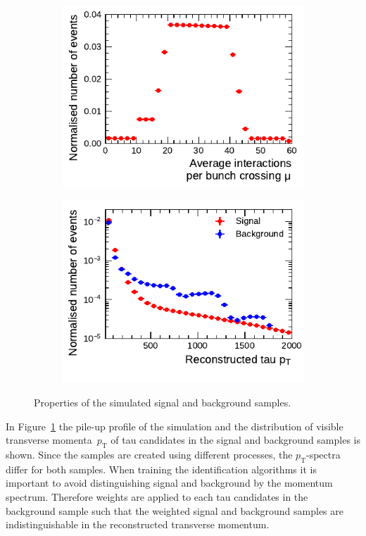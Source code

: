 \begin{figure}[htb]
  \centering
  \begin{subfigure}[t]{0.48\textwidth}
    \centering
    \includegraphics{./figures/bdt_perf/pt_mu_samples/mu.pdf}
  \end{subfigure}\hfill
  \begin{subfigure}[t]{0.48\textwidth}
    \centering
    \includegraphics{./figures/bdt_perf/pt_mu_samples/pt.pdf}
  \end{subfigure}
  \caption{Properties of the simulated signal and background samples.}
  \label{fig:pt_mu}
\end{figure}

In Figure~\ref{fig:pt_mu} the pile-up profile of the simulation and the
distribution of visible transverse momenta~$p_\text{T}$ of tau candidates in the
signal and background samples is shown. Since the samples are created using
different processes, the $p_\text{T}$-spectra differ for both samples. When
training the identification algorithms it is important to avoid distinguishing
signal and background by the momentum spectrum. Therefore weights are applied to
each tau candidates in the background sample such that the weighted signal and
background samples are indistinguishable in the reconstructed transverse
momentum.

